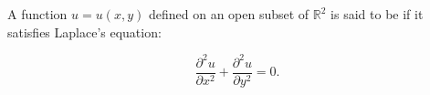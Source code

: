 A function $u = u(x, y)$ defined on an open subset of $\mathbb{R}^2$ is said to be  if it satisfies Laplace's equation:

$$\frac{\partial^2 u}{\partial x^2} + \frac{\partial^2 u}{\partial y^2} = 0.$$
